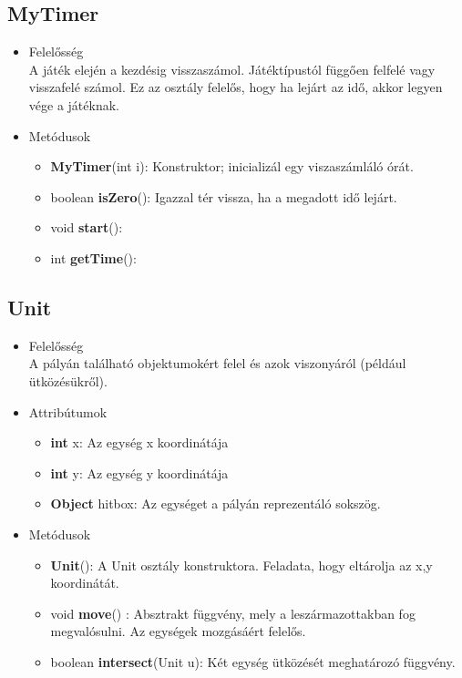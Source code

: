 \subsection{MyTimer}
\begin{itemize}
\item Felelősség\\
A játék elején a kezdésig visszaszámol. Játéktípustól függően felfelé vagy visszafelé számol. Ez az osztály felelős, hogy ha lejárt az idő, akkor legyen vége a játéknak.
\item Metódusok
	\begin{itemize}
		\item \textbf{MyTimer}(int i): Konstruktor; inicializál egy viszaszámláló órát.
		\item boolean \textbf{isZero}(): Igazzal tér vissza, ha a megadott idő lejárt.
		\item void \textbf{start}(): 
		\item int \textbf{getTime}(): 
	\end{itemize}
\end{itemize}

\subsection{Unit}
\begin{itemize}
\item Felelősség\\
A pályán található objektumokért felel és azok viszonyáról (például ütközésükről).
\item Attribútumok
	\begin{itemize}
		\item \textbf{int} x: Az egység x koordinátája
		\item \textbf{int} y: Az egység y koordinátája
		\item \textbf{Object} hitbox: Az egységet a pályán reprezentáló sokszög.
	\end{itemize}
\item Metódusok
	\begin{itemize}
	    \item \textbf{Unit}(): A Unit osztály konstruktora. Feladata, hogy eltárolja az x,y koordinátát.
		\item void \textbf{move}() : Absztrakt függvény, mely a leszármazottakban fog megvalósulni. Az egységek mozgásáért felelős.
		\item boolean \textbf{intersect}(Unit u): Két egység ütközését meghatározó függvény.
	\end{itemize}
\end{itemize}


